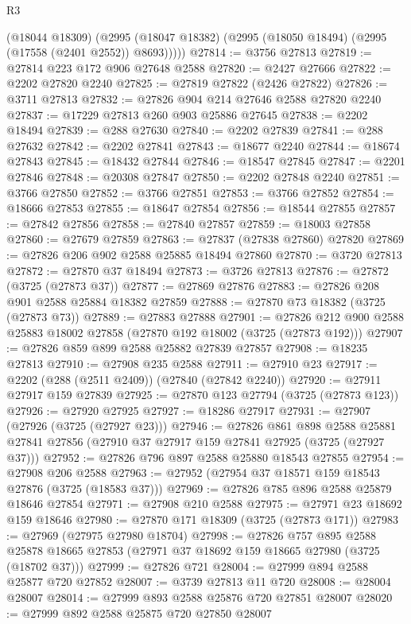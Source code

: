 \begin{lexlean}{R3}
\begin{coremodule}
        (@18044 @18309)
        (@2995 (@18047 @18382) (@2995 (@18050 @18494) (@2995 (@17558 (@2401 @2552)) @8693)))))
@27814 := @3756 @27813
@27819 := @27814 @223 @172 @906 @27648 @2588
@27820 := @2427 @27666
@27822 := @2202 @27820 @2240
@27825 := @27819 @27822 (@2426 @27822)
@27826 := @3711 @27813
@27832 := @27826 @904 @214 @27646 @2588 @27820 @2240
@27837 := @17229 @27813 @260 @903 @25886 @27645
@27838 := @2202 @18494
@27839 := @288 @27630
@27840 := @2202 @27839
@27841 := @288 @27632
@27842 := @2202 @27841
@27843 := @18677 @2240
@27844 := @18674 @27843
@27845 := @18432 @27844
@27846 := @18547 @27845
@27847 := @2201 @27846
@27848 := @20308 @27847
@27850 := @2202 @27848 @2240
@27851 := @3766 @27850
@27852 := @3766 @27851
@27853 := @3766 @27852
@27854 := @18666 @27853
@27855 := @18647 @27854
@27856 := @18544 @27855
@27857 := @27842 @27856
@27858 := @27840 @27857
@27859 := @18003 @27858
@27860 := @27679 @27859
@27863 := @27837 (@27838 @27860) @27820
@27869 := @27826 @206 @902 @2588 @25885 @18494 @27860
@27870 := @3720 @27813
@27872 := @27870 @37 @18494
@27873 := @3726 @27813
@27876 := @27872 (@3725 (@27873 @37))
@27877 := @27869 @27876
@27883 := @27826 @208 @901 @2588 @25884 @18382 @27859
@27888 := @27870 @73 @18382 (@3725 (@27873 @73))
@27889 := @27883 @27888
@27901 := @27826 @212 @900 @2588 @25883 @18002 @27858 (@27870 @192 @18002 (@3725 (@27873 @192)))
@27907 := @27826 @859 @899 @2588 @25882 @27839 @27857
@27908 := @18235 @27813
@27910 := @27908 @235 @2588
@27911 := @27910 @23
@27917 := @2202 (@288 (@2511 @2409)) (@27840 (@27842 @2240))
@27920 := @27911 @27917 @159 @27839
@27925 := @27870 @123 @27794 (@3725 (@27873 @123))
@27926 := @27920 @27925
@27927 := @18286 @27917
@27931 := @27907 (@27926 (@3725 (@27927 @23)))
@27946 := @27826
    @861
    @898
    @2588
    @25881
    @27841
    @27856
    (@27910 @37 @27917 @159 @27841 @27925 (@3725 (@27927 @37)))
@27952 := @27826 @796 @897 @2588 @25880 @18543 @27855
@27954 := @27908 @206 @2588
@27963 := @27952 (@27954 @37 @18571 @159 @18543 @27876 (@3725 (@18583 @37)))
@27969 := @27826 @785 @896 @2588 @25879 @18646 @27854
@27971 := @27908 @210 @2588
@27975 := @27971 @23 @18692 @159 @18646
@27980 := @27870 @171 @18309 (@3725 (@27873 @171))
@27983 := @27969 (@27975 @27980 @18704)
@27998 := @27826
    @757
    @895
    @2588
    @25878
    @18665
    @27853
    (@27971 @37 @18692 @159 @18665 @27980 (@3725 (@18702 @37)))
@27999 := @27826 @721
@28004 := @27999 @894 @2588 @25877 @720 @27852
@28007 := @3739 @27813 @11 @720
@28008 := @28004 @28007
@28014 := @27999 @893 @2588 @25876 @720 @27851 @28007
@28020 := @27999 @892 @2588 @25875 @720 @27850 @28007

\end{coremodule}
\end{lexlean}
